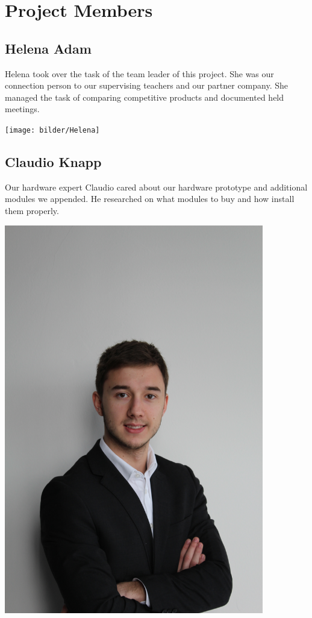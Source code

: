 \chapter*{Project Members}
\section*{Helena Adam}
Helena took over the task of the team leader of this project. She was our connection person to our supervising teachers and our partner company. She managed the task of comparing competitive products and documented held meetings.
\begin{center}
\texttt{[image: bilder/Helena]}
\end{center}
\section*{Claudio Knapp}
Our hardware expert Claudio cared about our hardware prototype and additional modules we appended. He researched on what modules to buy and how install them properly. 
\begin{center}
\includegraphics[width=0.85\textwidth]{bilder/Claudio}
\end{center}
